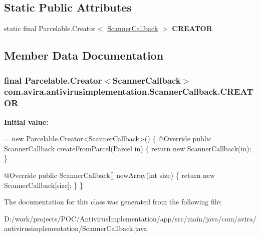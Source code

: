 \subsection*{Static Public Attributes}
\begin{DoxyCompactItemize}
\item 
static final Parcelable.\+Creator$<$ \hyperlink{classcom_1_1avira_1_1antivirusimplementation_1_1_scanner_callback}{Scanner\+Callback} $>$ {\bfseries C\+R\+E\+A\+T\+O\+R}
\end{DoxyCompactItemize}


\subsection{Member Data Documentation}
\hypertarget{classcom_1_1avira_1_1antivirusimplementation_1_1_scanner_callback_a9f046ad94c368de38a9b30c0f6d4211e}{}
\subsubsection[{C\+R\+E\+A\+T\+O\+R}]{\setlength{\rightskip}{0pt plus 5cm}final Parcelable.\+Creator$<${\bf Scanner\+Callback}$>$ com.\+avira.\+antivirusimplementation.\+Scanner\+Callback.\+C\+R\+E\+A\+T\+O\+R\hspace{0.3cm}{\ttfamily [static]}}\label{classcom_1_1avira_1_1antivirusimplementation_1_1_scanner_callback_a9f046ad94c368de38a9b30c0f6d4211e}
{\bfseries Initial value\+:}
\begin{DoxyCode}
= \textcolor{keyword}{new} Parcelable.Creator<ScannerCallback>() \{
        @Override
        \textcolor{keyword}{public} ScannerCallback createFromParcel(Parcel in) \{
            \textcolor{keywordflow}{return} \textcolor{keyword}{new} ScannerCallback(in);
        \}

        @Override
        \textcolor{keyword}{public} ScannerCallback[] newArray(\textcolor{keywordtype}{int} size) \{
            \textcolor{keywordflow}{return} \textcolor{keyword}{new} ScannerCallback[size];
        \}
    \}
\end{DoxyCode}


The documentation for this class was generated from the following file\+:\begin{DoxyCompactItemize}
\item 
D\+:/work/projects/\+P\+O\+C/\+Antivirus\+Implementation/app/src/main/java/com/avira/antivirusimplementation/Scanner\+Callback.\+java\end{DoxyCompactItemize}
